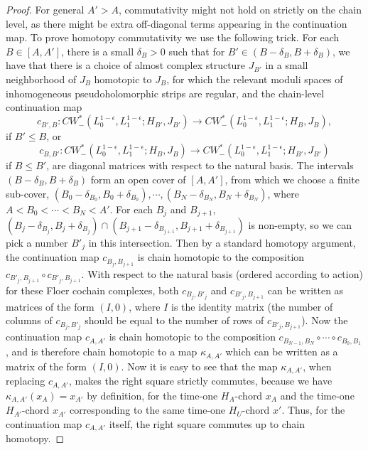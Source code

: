 \documentclass{amsart}
\numberwithin{equation}{section}
\numberwithin{figure}{section}
\begin{document}
\begin{proof}
	For general $A' > A$, commutativity might not hold on strictly on the chain level, as there might be extra off-diagonal terms appearing in the continuation map. To prove homotopy commutativity we use the following trick. For each $B \in [A, A']$, there is a small $\delta_{B} > 0$ such that for $B' \in (B - \delta_{B}, B + \delta_{B})$, we have that there is a choice of almost complex structure $J_{B'}$ in a small neighborhood of $J_{B}$ homotopic to $J_{B}$, for which the relevant moduli spaces of inhomogeneous pseudoholomorphic strips are regular, and the chain-level continuation map
\begin{equation*}
c_{B', B}: CW^{*}_{-}(L_{0}^{1-\epsilon}, L_{1}^{1-\epsilon}; H_{B'}, J_{B'}) \to CW^{*}_{-}(L_{0}^{1-\epsilon}, L_{1}^{1-\epsilon}; H_{B}, J_{B}),
\end{equation*}
if $B' \le B$, or
\begin{equation*}
c_{B, B'}: CW^{*}_{-}(L_{0}^{1-\epsilon}, L_{1}^{1-\epsilon}; H_{B}, J_{B}) \to CW^{*}_{-}(L_{0}^{1-\epsilon}, L_{1}^{1-\epsilon}; H_{B'}, J_{B'})
\end{equation*}
if $B \le B'$, are diagonal matrices with respect to the natural basis. The intervals $(B - \delta_{B}, B + \delta_{B})$ form an open cover of $[A, A']$, from which we choose a finite sub-cover, $(B_{0} - \delta_{B_{0}}, B_{0} + \delta_{B_{0}}), \cdots, (B_{N} - \delta_{B_{N}}, B_{N} + \delta_{B_{N}})$, where $A < B_{0} < \cdots < B_{N} < A'$. For each $B_{j}$ and $B_{j+1}$, $(B_{j} - \delta_{B_{j}}, B_{j} + \delta_{B_{j}}) \cap (B_{j+1} - \delta_{B_{j+1}}, B_{j+1} + \delta_{B_{j+1}})$ is non-empty, so we can pick a number $B'_{j}$ in this intersection. Then by a standard homotopy argument, the continuation map $c_{B_{j}, B_{j+1}}$ is chain homotopic to the composition $c_{B'_{j}, B_{j+1}} \circ c_{B'_{j}, B_{j+1}}$. With respect to the natural basis (ordered according to action) for these Floer cochain complexes, both $c_{B_{j}, B'_{j}}$ and $c_{B'_{j}, B_{j+1}}$ can be written as matrices of the form $(I, 0)$, where $I$ is the identity matrix (the number of columns of $c_{B_{j}, B'_{j}}$ should be equal to the number of rows of $c_{B'_{j}, B_{j+1}}$). Now the continuation map $c_{A, A'}$ is chain homotopic to the composition $c_{B_{N-1}, B_{N}} \circ \cdots \circ c_{B_{0}, B_{1}}$, and is therefore chain homotopic to a map $\kappa_{A, A'}$ which can be written as a matrix of the form $(I, 0)$. Now it is easy to see that the map $\kappa_{A, A'}$, when replacing $c_{A, A'}$, makes the right square strictly commutes, because we have $\kappa_{A, A'}(x_{A}) = x_{A'}$ by definition, for the time-one $H_{A}$-chord $x_{A}$ and the time-one $H_{A'}$-chord $x_{A'}$ corresponding to the same time-one $H_{U}$-chord $x'$. Thus, for the continuation map $c_{A, A'}$ itself, the right square commutes up to chain homotopy. \par
\end{proof}
\end{document}
